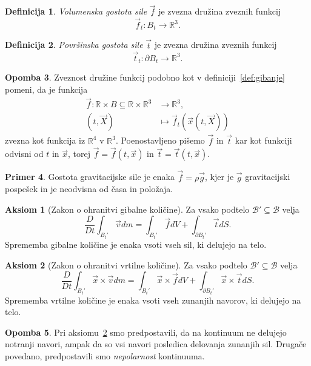 \documentclass[12pt,a4paper,twoside]{article}
\theoremstyle{definition} %
\newtheorem{definicija}{Definicija}[section]
\newtheorem{primer}[definicija]{Primer}
\newtheorem{opomba}[definicija]{Opomba}
\newtheorem{aksiom}{Aksiom}
\theoremstyle{plain} %
\numberwithin{equation}{section}
\newcommand{\R}{\mathbb R}
\newcommand{\B}{\mathcal{B}}
\newcommand{\DD}[2]{\ensuremath{\frac{D #1}{D #2}}}
\newcommand{\DDt}[1]{\DD{#1}{t}}
\newcommand{\vv}{\vec{v}}
\newcommand{\vt}{\vec{t}}
\newcommand{\vf}{\vec{f}}
\newcommand{\vX}{\vec{X}}
\newcommand{\vx}{\vec{x}}
\begin{document}
\begin{definicija}
  \emph{Volumenska gostota sile} $\vf$ je zvezna družina zveznih funkcij
  \begin{equation}
    \vf_t\colon B_t\to\R^3.
  \end{equation}
\end{definicija}
\begin{definicija}
  \emph{Površinska gostota sile} $\vt$ je zvezna družina zveznih funkcij
  \begin{equation}
   \vt_t\colon\partial B_t\to\R^3.
  \end{equation}
\end{definicija}
\begin{opomba}
  Zveznost družine funkcij podobno kot v definiciji~\ref{def:gibanje} pomeni, da je
  funkcija
  \begin{align}
    \vf\colon \R \times B \subseteq \R \times \R^3 &\to \R^3, \nonumber \\
    (t, \vX) &\mapsto \vf_t(\vx(t, \vX))
  \end{align}
  zvezna kot funkcija iz $\R^4$ v $\R^3$. Poenostavljeno pišemo $\vf$ in $\vt$ kar kot funkciji
  odvisni od $t$ in $\vx$, torej $\vf = \vf(t, \vx)$ in $\vt = \vt(t, \vx)$.
\end{opomba}
\begin{primer}
  Gostota gravitacijske sile je enaka $\vf = \rho \vec{g}$, kjer je $\vec{g}$ gravitacijski
  pospešek in je neodvisna od časa in položaja.
\end{primer}

\begin{aksiom}[Zakon o ohranitvi gibalne količine]
  \label{aks:gib}
  Za vsako podtelo $\B' \subseteq \B$ velja
  \begin{equation}
    \DDt{}\int_{B_t'} \vv dm = \int_{B_t'} \vf dV + \int_{\partial B_t'} \vec t dS.
    \label{eq:gib}
  \end{equation}
  Sprememba gibalne količine je enaka vsoti vseh sil, ki delujejo na telo.
\end{aksiom}

\begin{aksiom}[Zakon o ohranitvi vrtilne količine]
  \label{aks:vrt}
  Za vsako podtelo $\B' \subseteq \B$ velja
  \begin{equation}
    \DDt{}\int_{B_t'}\vx \times \vv dm = \int_{B_t'} \vx \times \vf dV +
    \int_{\partial B_t'} \vx\times\vt dS.
    \label{eq:vrt}
  \end{equation}
  Sprememba vrtilne količine je enaka vsoti vseh zunanjih navorov, ki delujejo
  na telo.
\end{aksiom}
\begin{opomba}
  Pri aksiomu~\ref{aks:vrt} smo predpostavili, da na kontinuum ne delujejo notranji navori, ampak da
  so vsi navori posledica delovanja zunanjih sil. Drugače povedano, predpostavili smo
  \emph{nepolarnost} kontinuuma.
\end{opomba}
\end{document}
